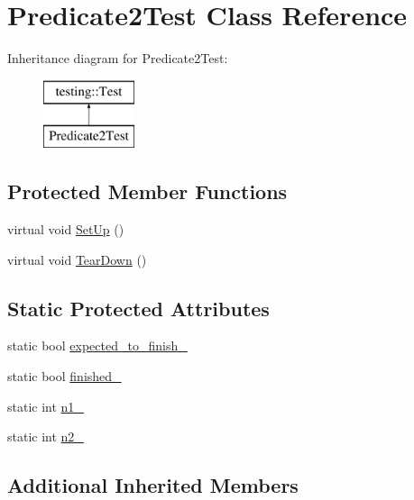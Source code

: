 \hypertarget{class_predicate2_test}{}\section{Predicate2\+Test Class Reference}
\label{class_predicate2_test}
Inheritance diagram for Predicate2\+Test\+:\begin{figure}[H]
\begin{center}
\leavevmode
\includegraphics[height=2.000000cm]{class_predicate2_test}
\end{center}
\end{figure}
\subsection*{Protected Member Functions}
\begin{DoxyCompactItemize}
\item 
virtual void \hyperlink{class_predicate2_test_a9778563daf4846327d32061c1a8ccba0}{Set\+Up} ()
\item 
virtual void \hyperlink{class_predicate2_test_a7379f8f7772af6b4c76edcc90b6aaaeb}{Tear\+Down} ()
\end{DoxyCompactItemize}
\subsection*{Static Protected Attributes}
\begin{DoxyCompactItemize}
\item 
static bool \hyperlink{class_predicate2_test_a56cf1f0f556addd9a62e0644dc1a86fc}{expected\+\_\+to\+\_\+finish\+\_\+}
\item 
static bool \hyperlink{class_predicate2_test_a30f4ef76d3004253078e767e5c653b85}{finished\+\_\+}
\item 
static int \hyperlink{class_predicate2_test_ac002d8e279b24e75906fd19973fc2170}{n1\+\_\+}
\item 
static int \hyperlink{class_predicate2_test_a9dbe5173570b9b911af2df889c287027}{n2\+\_\+}
\end{DoxyCompactItemize}
\subsection*{Additional Inherited Members}



